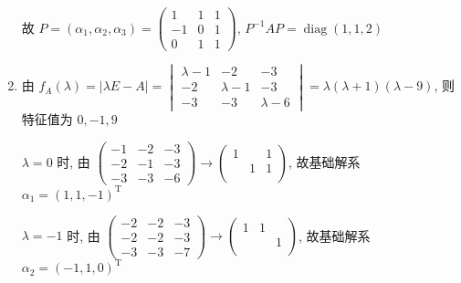 \begin{enumerate}
                   故 \( P = (\alpha_{1}, \alpha_{2}, \alpha_{3}) = \begin{pmatrix}
                       1  & 1 & 1 \\
                       -1 & 0 & 1 \\
                       0  & 1 & 1
                   \end{pmatrix} \), \( P^{-1}AP = \operatorname{diag}(1, 1, 2) \)
             \item %
                   由 \( f_{A}(\lambda) = |\lambda E - A| = \begin{vmatrix}
                       \lambda - 1 & -2          & -3          \\
                       -2          & \lambda - 1 & -3          \\
                       -3          & -3          & \lambda - 6
                   \end{vmatrix} = \lambda(\lambda + 1)(\lambda - 9) \), 则特征值为 \( 0, -1, 9 \)

                   \( \lambda = 0 \) 时, 由 \( \begin{pmatrix}
                       -1 & -2 & -3 \\
                       -2 & -1 & -3 \\
                       -3 & -3 & -6
                   \end{pmatrix} \rightarrow \begin{pmatrix}
                       1 &   & 1 \\
                         & 1 & 1 \\
                         &   &
                   \end{pmatrix} \), 故基础解系 \( \alpha_{1} = (1, 1, -1)^{\mathrm{T}} \)

                   \( \lambda = -1 \) 时, 由 \( \begin{pmatrix}
                       -2 & -2 & -3 \\
                       -2 & -2 & -3 \\
                       -3 & -3 & -7
                   \end{pmatrix} \rightarrow \begin{pmatrix}
                       1 & 1 &   \\
                         &   & 1 \\
                         &   &
                   \end{pmatrix} \), 故基础解系 \( \alpha_{2} = (-1, 1, 0)^{\mathrm{T}} \)


\end{enumerate}
